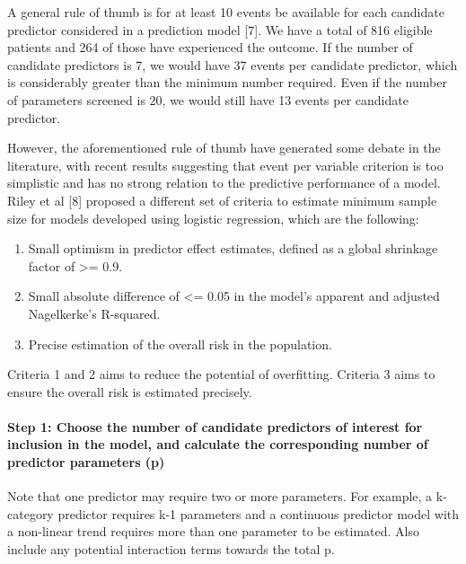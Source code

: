 \documentclass[
  letterpaper,
  DIV=11,
  numbers=noendperiod]{scrartcl}
\let\oldparagraph\paragraph
\renewcommand{\paragraph}[1]{\oldparagraph{#1}\mbox{}}
\providecommand{\tightlist}{%
  \setlength{\itemsep}{0pt}\setlength{\parskip}{0pt}}\usepackage{longtable,booktabs,array}
\begin{document}
A general rule of thumb is for at least 10 events be available for each
candidate predictor considered in a prediction model {[}7{]}. We have a
total of 816 eligible patients and 264 of those have experienced the
outcome. If the number of candidate predictors is 7, we would have 37
events per candidate predictor, which is considerably greater than the
minimum number required. Even if the number of parameters screened is
20, we would still have 13 events per candidate predictor.

However, the aforementioned rule of thumb have generated some debate in
the literature, with recent results suggesting that event per variable
criterion is too simplistic and has no strong relation to the predictive
performance of a model. Riley et al {[}8{]} proposed a different set of
criteria to estimate minimum sample size for models developed using
logistic regression, which are the following:

\begin{enumerate}
\def\labelenumi{\arabic{enumi}.}
\tightlist
\item
  Small optimism in predictor effect estimates, defined as a global
  shrinkage factor of \textgreater= 0.9.
\item
  Small absolute difference of \textless= 0.05 in the model's apparent
  and adjusted Nagelkerke's R-squared.
\item
  Precise estimation of the overall risk in the population.
\end{enumerate}

Criteria 1 and 2 aims to reduce the potential of overfitting. Criteria 3
aims to ensure the overall risk is estimated precisely.

\paragraph{Step 1: Choose the number of candidate predictors of interest
for inclusion in the model, and calculate the corresponding number of
predictor parameters
(p)}\label{step-1-choose-the-number-of-candidate-predictors-of-interest-for-inclusion-in-the-model-and-calculate-the-corresponding-number-of-predictor-parameters-p}

Note that one predictor may require two or more parameters. For example,
a k-category predictor requires k-1 parameters and a continuous
predictor model with a non-linear trend requires more than one parameter
to be estimated. Also include any potential interaction terms towards
the total p.
\end{document}
